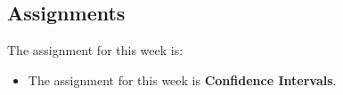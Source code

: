 \subsection{Assignments}

The assignment for this week is:

\begin{itemize}
    \item The assignment for this week is \textbf{Confidence Intervals}. 
\end{itemize}